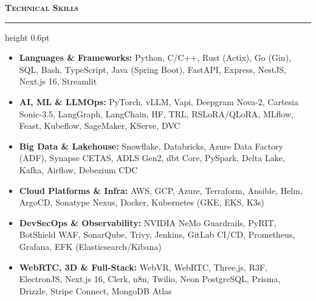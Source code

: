 \documentclass[10pt,a4paper]{article}
\newcommand{\resumesection}[1]{%
    \vspace{2.2pt}%
    {\color{burgundy}\scshape\bfseries\fontsize{9.0pt}{10.2pt}\selectfont #1}%
    \vspace{0.6pt}%
    \hrule height 0.6pt\relax%
    \vspace{1.6pt}%
}
\begin{document}
\begin{minipage}[t]{0.488\textwidth}
    \resumesection{Technical Skills}
    \begin{itemize}[leftmargin=7pt]
        \item \textbf{Languages \& Frameworks:} Python, C/C++, Rust (Actix), Go (Gin), SQL, Bash, TypeScript, Java (Spring Boot), FastAPI, Express, NestJS, Next.js 16, Streamlit
        \item \textbf{AI, ML \& LLMOps:} PyTorch, vLLM, Vapi, Deepgram Nova-2, Cartesia Sonic-3.5, LangGraph, LangChain, HF, TRL, RSLoRA/QLoRA, MLflow, Feast, Kubeflow, SageMaker, KServe, DVC
        \item \textbf{Big Data \& Lakehouse:} Snowflake, Databricks, Azure Data Factory (ADF), Synapse CETAS, ADLS Gen2, dbt Core, PySpark, Delta Lake, Kafka, Airflow, Debezium CDC
        \item \textbf{Cloud Platforms \& Infra:} AWS, GCP, Azure, Terraform, Ansible, Helm, ArgoCD, Sonatype Nexus, Docker, Kubernetes (GKE, EKS, K3s)
        \item \textbf{DevSecOps \& Observability:} NVIDIA NeMo Guardrails, PyRIT, BotShield WAF, SonarQube, Trivy, Jenkins, GitLab CI/CD, Prometheus, Grafana, EFK (Elasticsearch/Kibana)
        \item \textbf{WebRTC, 3D \& Full-Stack:} WebVR, WebRTC, Three.js, R3F, ElectronJS, Next.js 16, Clerk, n8n, Twilio, Neon PostgreSQL, Prisma, Drizzle, Stripe Connect, MongoDB Atlas
    \end{itemize}

\end{minipage}
\end{document}
